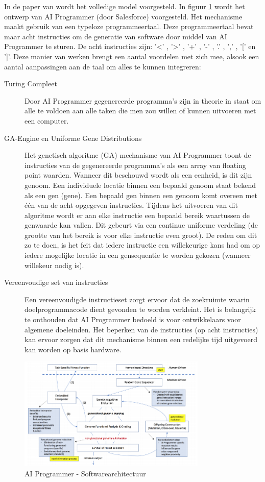 In de paper van \textcite{aiProgrammer} wordt het volledige model voorgesteld. In figuur \ref{fig:aiprog} wordt het ontwerp van AI Programmer (door Salesforce) voorgesteld. Het mechanisme maakt gebruik van een typeloze programmeertaal. Deze programmeertaal bevat maar acht instructies om de generatie van software door middel van AI Programmer te sturen. De acht instructies zijn: '<' , '>' , '+' , '-' , '.' , ',' , '[' en ']'. Deze manier van werken brengt een aantal voordelen met zich mee, alsook een aantal aanpassingen aan de taal om alles te kunnen integreren:
\begin{description}
	\item[Turing Compleet] Door AI Programmer gegenereerde programma’s zijn in theorie in staat om alle te voldoen aan alle taken die men zou willen of kunnen uitvoeren met een computer.
	\item[GA-Engine en Uniforme Gene Distributions] Het genetisch algoritme (GA) mechanisme van AI Programmer toont de instructies van de gegenereerde programma’s als een array van floating point waarden. Wanneer dit beschouwd wordt als een eenheid, is dit zijn genoom. Een individuele locatie binnen een bepaald genoom staat bekend als een gen (gene). Een bepaald gen binnen een genoom komt overeen met één van de acht opgegeven instructies. Tijdens het uitvoeren van dit algoritme wordt er aan elke instructie een bepaald bereik waartussen de genwaarde kan vallen. Dit gebeurt via een continue uniforme verdeling (de grootte van het bereik is voor elke instructie even groot). De reden om dit zo te doen, is het feit dat iedere instructie een willekeurige kans had om op iedere mogelijke locatie in een gensequentie te worden gekozen (wanneer willekeur nodig is).
	\item[Vereenvoudige set van instructies]  Een vereenvoudigde instructieset zorgt ervoor dat de zoekruimte waarin doelprogrammacode dient gevonden te worden verkleint. Het is belangrijk te onthouden dat AI Programmer bedoeld is voor ontwikkelaars voor algemene doeleinden. Het beperken van de instructies (op acht instructies) kan ervoor zorgen dat dit mechanisme binnen een redelijke tijd uitgevoerd kan worden op basis hardware.
\end{description}

\begin{figure}[htb]
	\centering
	\includegraphics[width=0.80\textwidth]{img/aiprogmodel}
	\caption[AI Programmer Model]{AI Programmer - Softwarearchitectuur}
	\label{fig:aiprog}
\end{figure}
\break 

